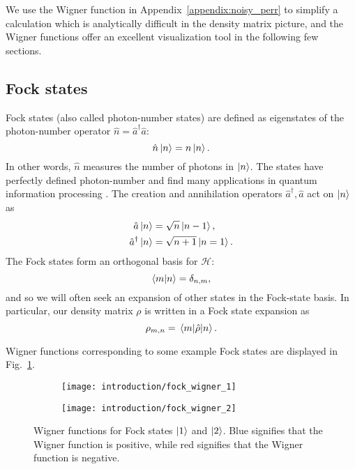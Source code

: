 We use the Wigner function in Appendix~\ref{appendix:noisy_perr} to simplify a calculation which is analytically difficult in the density matrix picture, and the Wigner functions offer an excellent visualization tool in the following few sections.


\FloatBarrier
\subsection{Fock states}
Fock states (also called photon-number states) are defined as eigenstates of the photon-number operator $\hat{n} = \hat{a}^\dagger \hat{a}$:
\begin{equation}
\hat{n} \ket{n} = n \ket{n}.
\end{equation}
In other words, $\hat{n}$ measures the number of photons in $\ket{n}$. The states have perfectly defined photon-number and find many applications in quantum information processing \cite{Bennett1984, Adami1999}. The creation and annihilation operators $\hat{a}^\dagger, \hat{a}$ act on $\ket{n}$ as 
\begin{align*}
\hat{a}\ket{n} &= \sqrt{n}\ket{n-1}, \\
\hat{a}^\dagger \ket{n} &= \sqrt{n+1} \ket{n=1}.
\end{align*}
The Fock states form an orthogonal basis for $\mathcal{H}$:
\begin{equation}
\ip{m}{n} = \delta_{n, m},
\end{equation}
and so we will often seek an expansion of other states in the Fock-state basis. In particular, our density matrix $\rho$ is written in a Fock state expansion as
\begin{equation}
\rho_{m, n} = \mel{m}{\hat{\rho}}{n}.
\end{equation}

\noindent Wigner functions corresponding to some example Fock states are displayed in Fig.~\ref{fig:intro_fock_wigner}.



\begin{figure}[htp]
\centering
\captionsetup{width=0.8\linewidth}
	\begin{subfigure}{0.49\linewidth}
		\centering
		\texttt{[image: introduction/fock\_wigner\_1]}
	\end{subfigure}
	\begin{subfigure}{0.49\linewidth}
		\centering
		\texttt{[image: introduction/fock\_wigner\_2]}
	\end{subfigure}
\caption{\label{fig:intro_fock_wigner} Wigner functions for Fock states $\ket{1}$ and $\ket{2}$. Blue signifies that the Wigner function is positive, while red signifies that the Wigner function is negative. }
\end{figure}



